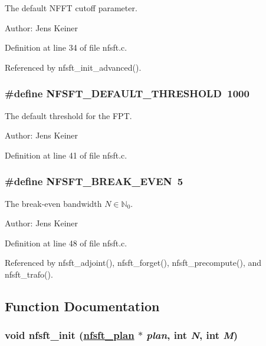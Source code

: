 The default NFFT cutoff parameter. 

\begin{Desc}
\item[Author:]Jens Keiner \end{Desc}


Definition at line 34 of file nfsft.c.

Referenced by nfsft\_\-init\_\-advanced().\hypertarget{group__nfsft_ga47}{
\subsubsection[NFSFT\_\-DEFAULT\_\-THRESHOLD]{\setlength{\rightskip}{0pt plus 5cm}\#define NFSFT\_\-DEFAULT\_\-THRESHOLD~1000}}
\label{group__nfsft_ga47}


The default threshold for the FPT. 

\begin{Desc}
\item[Author:]Jens Keiner \end{Desc}


Definition at line 41 of file nfsft.c.\hypertarget{group__nfsft_ga48}{
\subsubsection[NFSFT\_\-BREAK\_\-EVEN]{\setlength{\rightskip}{0pt plus 5cm}\#define NFSFT\_\-BREAK\_\-EVEN~5}}
\label{group__nfsft_ga48}


The break-even bandwidth $N \in \mathbb{N}_0$. 

\begin{Desc}
\item[Author:]Jens Keiner \end{Desc}


Definition at line 48 of file nfsft.c.

Referenced by nfsft\_\-adjoint(), nfsft\_\-forget(), nfsft\_\-precompute(), and nfsft\_\-trafo().

\subsection{Function Documentation}
\hypertarget{group__nfsft_ga1}{
\subsubsection[nfsft\_\-init]{\setlength{\rightskip}{0pt plus 5cm}void nfsft\_\-init (\hyperlink{structnfsft__plan}{nfsft\_\-plan} $\ast$ {\em plan}, int {\em N}, int {\em M})}}
\label{group__nfsft_ga1}


